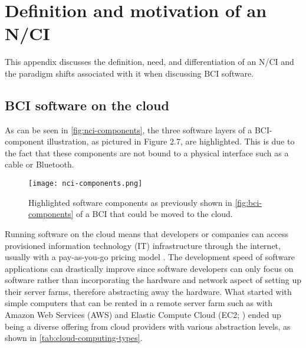 \chapter{Definition and motivation of an N/CI}
\label{appendix1-definition-and-motivation-of-an-nci}
\graphicspath{{Appendix1/Figs/}{Appendix1/Figs/}}

This appendix discusses the definition, need, and differentiation of an N/CI and the paradigm shifts associated with it when discussing BCI software.

\section*{BCI software on the cloud}
\label{appendix1-bci-software-on-the-cloud}

As can be seen in \autoref{fig:nci-components}, the three software layers of a BCI-component illustration, as pictured in Figure 2.7, are highlighted. This is due to the fact that these components are not bound to a physical interface such as a cable or Bluetooth.


\begin{figure}[ht]
  \centering
  \texttt{[image: nci-components.png]}
  \caption{Highlighted software components as previously shown in \autoref{fig:bci-components} of a BCI that could be moved to the cloud.}
  \label{fig:nci-components}
\end{figure}

Running software on the cloud means that developers or companies can access provisioned information technology (IT) infrastructure through the internet, usually with a pay-as-you-go pricing model \citep{amazon_web_services_inc_what_nodate}. The development speed of software applications can drastically improve since software developers can only focus on software rather than incorporating the hardware and network aspect of setting up their server farms, therefore abstracting away the hardware. What started with simple computers that can be rented in a remote server farm such as with Amazon Web Services (AWS) and Elastic Compute Cloud (EC2; \cite{barr_amazon_2006}) ended up being a diverse offering from cloud providers with various abstraction levels, as shown in \autoref{tab:cloud-computing-types}.

